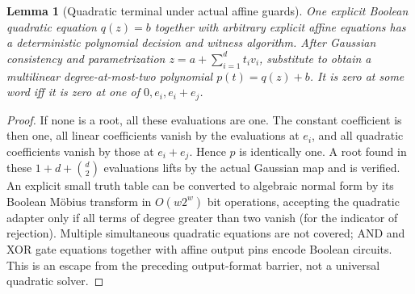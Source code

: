 \documentclass[11pt]{article}
\newtheorem{lemma}[theorem]{Lemma}
\begin{document}
\begin{lemma}[Quadratic terminal under actual affine guards]\label{lem:bs17-quadratic}
One explicit Boolean quadratic equation $q(z)=b$ together with arbitrary explicit affine equations has a deterministic polynomial decision and witness algorithm. After Gaussian consistency and parametrization $z=a+\sum_{i=1}^d t_iv_i$, substitute to obtain a multilinear degree-at-most-two polynomial $p(t)=q(z)+b$. It is zero at some word iff it is zero at one of $0,e_i,e_i+e_j$.
\end{lemma}
\begin{proof}
If none is a root, all these evaluations are one. The constant coefficient is then one, all linear coefficients vanish by the evaluations at $e_i$, and all quadratic coefficients vanish by those at $e_i+e_j$. Hence $p$ is identically one. A root found in these $1+d+\binom d2$ evaluations lifts by the actual Gaussian map and is verified. An explicit small truth table can be converted to algebraic normal form by its Boolean Möbius transform in $O(w2^w)$ bit operations, accepting the quadratic adapter only if all terms of degree greater than two vanish (for the indicator of rejection). Multiple simultaneous quadratic equations are not covered; AND and XOR gate equations together with affine output pins encode Boolean circuits. This is an escape from the preceding output-format barrier, not a universal quadratic solver.
\end{proof}
\end{document}
